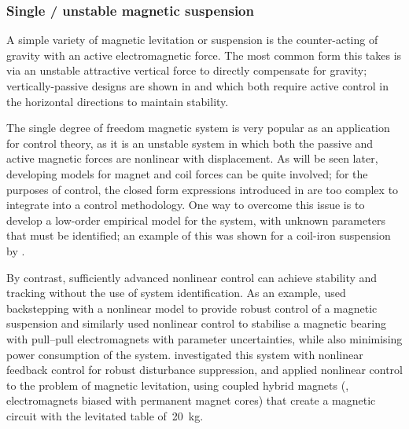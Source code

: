 \documentclass[11pt,a4paper]{memoir}
\begin{document}
\subsubsection{Single \dof/ unstable magnetic suspension}

A simple variety of magnetic levitation or suspension is the counter-acting of gravity with an active electromagnetic force.
The most common form this takes is via an unstable attractive vertical force to directly compensate for gravity; vertically-passive designs are shown in  and  which both require active control in the horizontal directions to maintain stability.

The single degree of freedom magnetic system is very popular as an application for control theory, as it is an unstable system in which both the passive and active magnetic forces are nonlinear with displacement.
As will be seen later, developing models for magnet and coil forces can be quite involved; for the purposes of control, the closed form expressions introduced in  are too complex to integrate into a control methodology.
One way to overcome this issue is to develop a low-order empirical model for the system, with unknown parameters that must be identified; an example of this was shown for a coil-iron suspension by \textcite{agamennoni2004}.


By contrast, sufficiently advanced nonlinear control can achieve stability and tracking without the use of system identification.
As an example, \textcite{mahmoud2003} used backstepping with a nonlinear model to provide robust control of a magnetic suspension and \textcite{queiroz2007} similarly used nonlinear control to stabilise a magnetic bearing with pull--pull electromagnets with parameter uncertainties, while also minimising power consumption of the system.
\textcite{gentili2003} investigated this system with nonlinear feedback control for robust disturbance suppression, and
\textcite{chang2001} applied nonlinear control to the problem of magnetic levitation, using coupled hybrid magnets (\ie, electromagnets biased with permanent magnet cores) that create a magnetic circuit with the levitated table of~\SI{20}{kg}.
\end{document}
